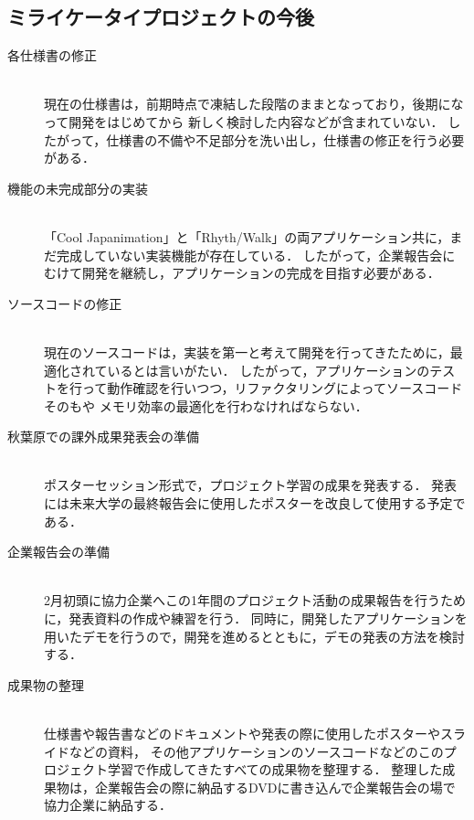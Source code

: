 \subsection{ミライケータイプロジェクトの今後}

\begin{description}

\item[各仕様書の修正]\mbox{}\\ 
現在の仕様書は，前期時点で凍結した段階のままとなっており，後期になって開発をはじめてから
新しく検討した内容などが含まれていない．
したがって，仕様書の不備や不足部分を洗い出し，仕様書の修正を行う必要がある．

\item[機能の未完成部分の実装]\mbox{}\\ 
「Cool Japanimation」と「Rhyth/Walk」の両アプリケーション共に，まだ完成していない実装機能が存在している．
したがって，企業報告会にむけて開発を継続し，アプリケーションの完成を目指す必要がある．

\item[ソースコードの修正]\mbox{}\\ 
現在のソースコードは，実装を第一と考えて開発を行ってきたために，最適化されているとは言いがたい．
したがって，アプリケーションのテストを行って動作確認を行いつつ，リファクタリングによってソースコードそのもや
メモリ効率の最適化を行わなければならない．

\item[秋葉原での課外成果発表会の準備]\mbox{}\\ 
ポスターセッション形式で，プロジェクト学習の成果を発表する．
発表には未来大学の最終報告会に使用したポスターを改良して使用する予定である．

\item[企業報告会の準備]\mbox{}\\ 
2月初頭に協力企業へこの1年間のプロジェクト活動の成果報告を行うために，発表資料の作成や練習を行う．
同時に，開発したアプリケーションを用いたデモを行うので，開発を進めるとともに，デモの発表の方法を検討する．

\item[成果物の整理]\mbox{}\\ 
仕様書や報告書などのドキュメントや発表の際に使用したポスターやスライドなどの資料，
その他アプリケーションのソースコードなどのこのプロジェクト学習で作成してきたすべての成果物を整理する．
整理した成果物は，企業報告会の際に納品するDVDに書き込んで企業報告会の場で協力企業に納品する．
\end{description}

